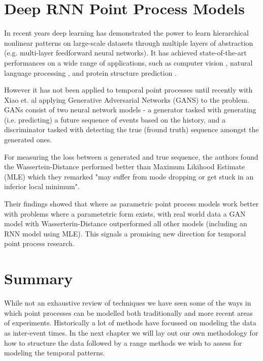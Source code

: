\section{Deep RNN Point Process Models}

In recent years deep learning has demonstrated the power to learn hierarchical nonlinear patterns on large-scale datasets \parencite{DL} through multiple layers of abstraction (e.g. multi-layer feedforward neural networks). It has achieved state-of-the-art performances on a wide range of applications, such as computer vision \parencite{ImageNet}, natural language processing \parencite{Socher}, and protein structure prediction \parencite{Lena}.

However it has not been applied to temporal point processes until recently with Xiao et. al \parencite{Wass} applying Generative Adversarial Networks (GANS) to the problem. GANs consist of two neural network models - a generator tasked with generating (i.e. predicting) a future sequence of events based on the history, and a discriminator tasked with detecting the true (fround truth) sequence amongst the generated ones.

For measuring the loss between a generated and true sequence, the authors found the Wassertein-Distance \parencite{WassGAN} performed better than Maximum Likihood Estimate (MLE) which they remarked "may suffer from mode dropping or get stuck in an inferior local minimum".

Their findings showed that where as parametric point process models work better with problems where a parametetric form exists, with real world data a GAN model with Wasserterin-Distance outperformed all other models (including an RNN model using MLE). This signals a promising new direction for temporal point process research.

\section{Summary}

While not an exhaustive review of techniques we have seen some of the ways in which point processes can be modelled both traditionally and more recent areas of experiments. Historically a lot of methods have focussed on modeling the data as inter-event times. In the next chapter we will lay out our own methodology for how to structure the data followed by a range methods we wish to assess for modeling the temporal patterns.